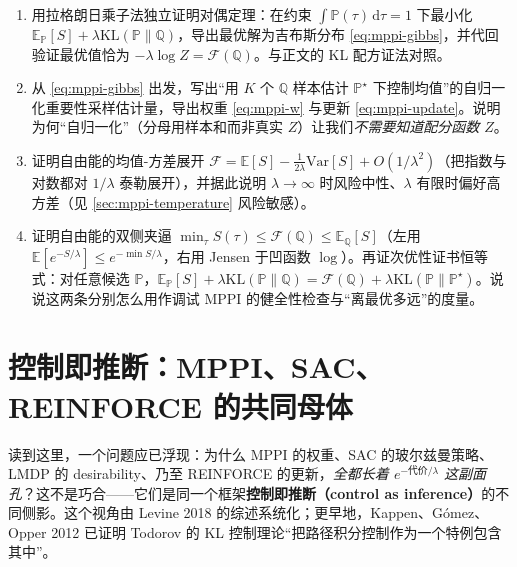 \begin{practice}
\begin{enumerate}
  \item 用拉格朗日乘子法独立证明对偶定理：在约束 $\int\mathbb{P}(\tau)\,\mathrm{d}\tau=1$ 下最小化 $\mathbb{E}_{\mathbb{P}}[S]+\lambda\mathrm{KL}(\mathbb{P}\|\mathbb{Q})$，导出最优解为吉布斯分布 \cref{eq:mppi-gibbs}，并代回验证最优值恰为 $-\lambda\log Z=\mathcal{F}(\mathbb{Q})$。与正文的 KL 配方证法对照。
  \item 从 \cref{eq:mppi-gibbs} 出发，写出“用 $K$ 个 $\mathbb{Q}$ 样本估计 $\mathbb{P}^\star$ 下控制均值”的自归一化重要性采样估计量，导出权重 \cref{eq:mppi-w} 与更新 \cref{eq:mppi-update}。说明为何“自归一化”（分母用样本和而非真实 $Z$）让我们\emph{不需要知道配分函数 $Z$}。
  \item 证明自由能的均值-方差展开 $\mathcal{F}=\mathbb{E}[S]-\tfrac{1}{2\lambda}\mathrm{Var}[S]+O(1/\lambda^2)$（把指数与对数都对 $1/\lambda$ 泰勒展开），并据此说明 $\lambda\to\infty$ 时风险中性、$\lambda$ 有限时偏好高方差（见 \cref{sec:mppi-temperature} 风险敏感）。
  \item 证明自由能的双侧夹逼 $\min_\tau S(\tau)\le\mathcal{F}(\mathbb{Q})\le\mathbb{E}_{\mathbb{Q}}[S]$（左用 $\mathbb{E}[e^{-S/\lambda}]\le e^{-\min S/\lambda}$，右用 Jensen 于凹函数 $\log$）。再证次优性证书恒等式：对任意候选 $\mathbb{P}$，$\mathbb{E}_{\mathbb{P}}[S]+\lambda\mathrm{KL}(\mathbb{P}\|\mathbb{Q})=\mathcal{F}(\mathbb{Q})+\lambda\mathrm{KL}(\mathbb{P}\|\mathbb{P}^\star)$。说说这两条分别怎么用作调试 MPPI 的健全性检查与“离最优多远”的度量。
\end{enumerate}
\end{practice}

\section{控制即推断：MPPI、SAC、REINFORCE 的共同母体}
\label{sec:mppi-inference}

读到这里，一个问题应已浮现：为什么 MPPI 的权重、SAC 的玻尔兹曼策略、LMDP 的 desirability、乃至 REINFORCE 的更新，\emph{全都长着 $e^{-\text{代价}/\lambda}$ 这副面孔}？这不是巧合——它们是同一个框架\textbf{控制即推断（control as inference）}的不同侧影。这个视角由 Levine 2018 的综述系统化\cite{levine2018reinforcement}；更早地，Kappen、Gómez、Opper 2012 已证明 Todorov 的 KL 控制理论“把路径积分控制作为一个特例包含其中”\cite{kappen2012optimal}。

